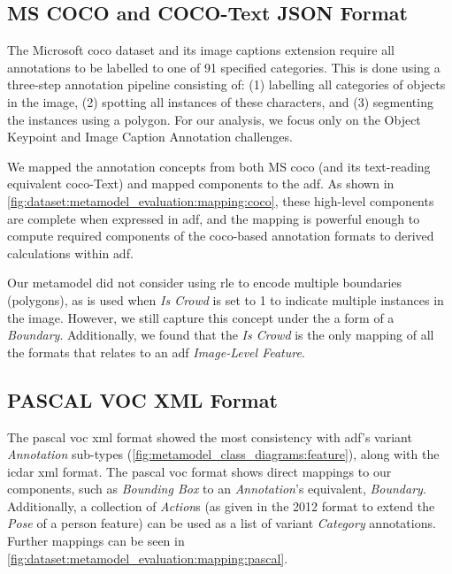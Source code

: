 \subsection{MS COCO and COCO-Text JSON Format}

The Microsoft \gls{coco} \citep{Lin:2014vma} dataset and its image captions extension \citep{Chen:2015ur} require all annotations to be labelled to one of 91 specified categories. This is done using a three-step annotation pipeline consisting of: (1) labelling all categories of objects in the image, (2) spotting all instances of these characters, and (3) segmenting the instances using a polygon. For our analysis, we focus only on the Object Keypoint and Image Caption Annotation challenges.

We mapped the annotation concepts from both MS \gls{coco} (and its text-reading equivalent \gls{coco}-Text) and mapped components to the \gls{adf}. As shown in \cref{fig:dataset:metamodel_evaluation:mapping:coco}, these high-level components are complete when expressed in \gls{adf}, and the mapping is powerful enough to compute required components of the \gls{coco}-based annotation formats to derived calculations within \gls{adf}.

Our metamodel did not consider using \gls{rle} to encode multiple boundaries (polygons), as is used when \textit{Is Crowd} is set to 1 to indicate multiple instances in the image. However, we still capture this concept under the a form of a \textit{Boundary}. Additionally, we found that the \textit{Is Crowd} is the only mapping of all the formats that relates to an \gls{adf} \textit{Image-Level Feature}.

\subsection{PASCAL VOC XML Format}

The \gls{pascal} \gls{voc} \gls{xml} format showed the most consistency with \gls{adf}'s variant \textit{Annotation} sub-types (\cref{fig:metamodel_class_diagrams:feature}), along with the \gls{icdar} \gls{xml} format. The \gls{pascal} \gls{voc} format shows direct mappings to our components, such as \textit{Bounding Box} to an \textit{Annotation}'s equivalent, \textit{Boundary}. Additionally, a collection of \textit{Action}s (as given in the 2012 format to extend the \textit{Pose} of a person feature) can be used as a list of variant \textit{Category} annotations. Further mappings can be seen in \cref{fig:dataset:metamodel_evaluation:mapping:pascal}.


